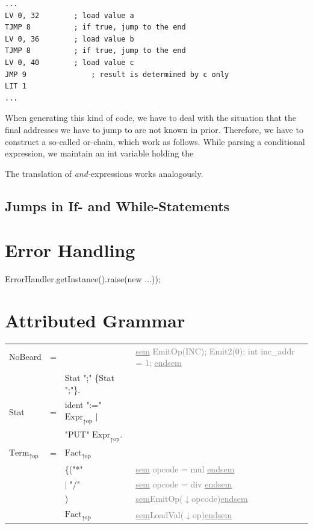 \documentclass[11pt]{report}
\newcommand{\leongage}{NoBeard}
\newcommand{\alternative}{$\mid \;$}
\newenvironment{atg}[1][6cm]
	{\begin{tabular}[b]{lclp{#1}}}
	{\end{tabular}}
\newcommand{\atgsy}[2]{$\textrm{#1}_\textrm{#2}$}
\newcommand{\outattr}{$\uparrow$}
\newcommand{\inattr}{$\downarrow$}
\newcommand{\semantics}[1]{\textcolor{Gray}{#1}}
\newenvironment {sem}
	{\underline{sem}}
	{\underline{endsem}}
\begin{document}

\begin{lstlisting}[float,caption={Assembler code of or-chain}, captionpos=b,label=cod:orchain]
...
LV 0, 32		; load value a
TJMP 8			; if true, jump to the end
LV 0, 36		; load value b
TJMP 8			; if true, jump to the end
LV 0, 40		; load value c
JMP 9				; result is determined by c only
LIT 1
...
\end{lstlisting}
When generating this kind of code, we have to deal with the situation that the final addresses we have to jump to are not known in prior. Therefore, we have to construct a so-called or-chain, which work as follows. While parsing a conditional expression, we maintain an int variable holding the 

The translation of {\em and-}expressions works analogously.

\section{Jumps in If- and While-Statements}

\chapter{Error Handling}
ErrorHandler.getInstance().raise(new ...));

\chapter{Attributed Grammar}
\begin{atg}[4.5cm]
\leongage &=& & \semantics{\begin{sem} \newline EmitOp(INC); \newline Emit2(0); \newline int inc\_addr = 1; \newline \end{sem}}\\
&&Stat ";" \{Stat ";"\}. \\

Stat & = & ident ":=" \atgsy{Expr}{\outattr op}  \alternative \\
&& "PUT" \atgsy{Expr}{\outattr op}. \\

\atgsy{Term}{\outattr op} &=& \atgsy{Fact}{\outattr op}  \\
&& \{("*" &\semantics{\begin{sem} opcode = mul \end{sem}}\\
&& \alternative "/" & \semantics{\begin{sem} opcode = div \end{sem}}\\
&&) & \semantics{\begin{sem}EmitOp(\inattr opcode)\end{sem}}\\
&&\atgsy{Fact}{\outattr op} & \semantics{\begin{sem}LoadVal(\inattr op)\end{sem}}
\end{atg}

{}

\end{document}
